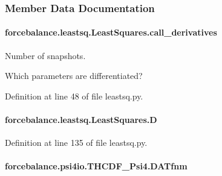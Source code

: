 \subsubsection{Member Data Documentation}
\hypertarget{classforcebalance_1_1leastsq_1_1LeastSquares_a58b3039968f72ab1a98e18deed0f8a0a}{
\paragraph[{call\-\_\-derivatives}]{\setlength{\rightskip}{0pt plus 5cm}forcebalance.\-leastsq.\-Least\-Squares.\-call\-\_\-derivatives\hspace{0.3cm}{\ttfamily [inherited]}}}\label{classforcebalance_1_1leastsq_1_1LeastSquares_a58b3039968f72ab1a98e18deed0f8a0a}


Number of snapshots. 

Which parameters are differentiated? 

Definition at line 48 of file leastsq.\-py.

\hypertarget{classforcebalance_1_1leastsq_1_1LeastSquares_aa2565a2a75466e9f759ba3a67b85d0d2}{
\paragraph[{D}]{\setlength{\rightskip}{0pt plus 5cm}forcebalance.\-leastsq.\-Least\-Squares.\-D\hspace{0.3cm}{\ttfamily [inherited]}}}\label{classforcebalance_1_1leastsq_1_1LeastSquares_aa2565a2a75466e9f759ba3a67b85d0d2}


Definition at line 135 of file leastsq.\-py.

\hypertarget{classforcebalance_1_1psi4io_1_1THCDF__Psi4_a939888d130078cd0b36e3e19a9d0585a}{
\paragraph[{D\-A\-Tfnm}]{\setlength{\rightskip}{0pt plus 5cm}forcebalance.\-psi4io.\-T\-H\-C\-D\-F\-\_\-\-Psi4.\-D\-A\-Tfnm}}\label{classforcebalance_1_1psi4io_1_1THCDF__Psi4_a939888d130078cd0b36e3e19a9d0585a}



